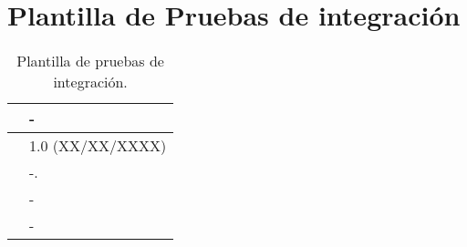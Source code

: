 \section{Plantilla de Pruebas de integración}

\begin{table}[H]
\begin{center}
\begin{tabular}{|p{3cm}|p{10cm}|} \hline
\centering {\bf PI-XX} & -  \\ \hline\hline
\centering {\bf Versión} & 1.0 (XX/XX/XXXX) \\ \hline
\centering {\bf Descripción} &  -. \\ \hline
\centering {\bf Criterio de aceptación} & - \\ \hline
\centering {\bf Estado} & - \\ \hline
\end{tabular}
\caption{Plantilla de pruebas de integración.}
\label{enlacePIX}
\end{center}
\end{table}